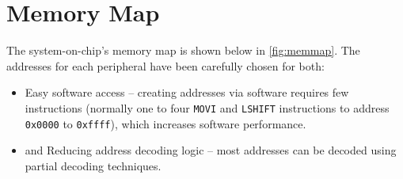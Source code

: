 \section{Memory Map}
The system-on-chip's memory map is shown below in \cref{fig:memmap}. The addresses for each peripheral have been carefully chosen for both:
\begin{itemize}
\item Easy software access -- creating addresses via software requires few instructions (normally one to four \verb|MOVI| and \verb|LSHIFT| instructions to address \verb|0x0000| to  \verb|0xffff|), which increases software performance.
\item and Reducing address decoding logic -- most addresses can be decoded using partial decoding techniques.
\end{itemize}

